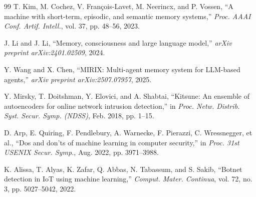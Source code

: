 \documentclass[11pt,letterpaper,onecolumn]{article}
\begin{document}
\begin{thebibliography}{99}
T. Kim, M. Cochez, V. Fran\c{c}ois-Lavet, M. Neerincx, and P. Vossen, ``A machine with short-term, episodic, and semantic memory systems,'' \emph{Proc. AAAI Conf. Artif. Intell.}, vol. 37, pp. 48--56, 2023.

J. Li and J. Li, ``Memory, consciousness and large language model,'' \emph{arXiv preprint arXiv:2401.02509}, 2024.

Y. Wang and X. Chen, ``MIRIX: Multi-agent memory system for LLM-based agents,'' \emph{arXiv preprint arXiv:2507.07957}, 2025.

Y. Mirsky, T. Doitshman, Y. Elovici, and A. Shabtai, ``Kitsune: An ensemble of autoencoders for online network intrusion detection,'' in \emph{Proc. Netw. Distrib. Syst. Secur. Symp. (NDSS)}, Feb. 2018, pp. 1--15.

D. Arp, E. Quiring, F. Pendlebury, A. Warnecke, F. Pierazzi, C. Wressnegger, et al., ``Dos and don'ts of machine learning in computer security,'' in \emph{Proc. 31st USENIX Secur. Symp.}, Aug. 2022, pp. 3971--3988.

K. Alissa, T. Alyas, K. Zafar, Q. Abbas, N. Tabassum, and S. Sakib, ``Botnet detection in IoT using machine learning,'' \emph{Comput. Mater. Continua}, vol. 72, no. 3, pp. 5027--5042, 2022.

\end{thebibliography}
\end{document}
